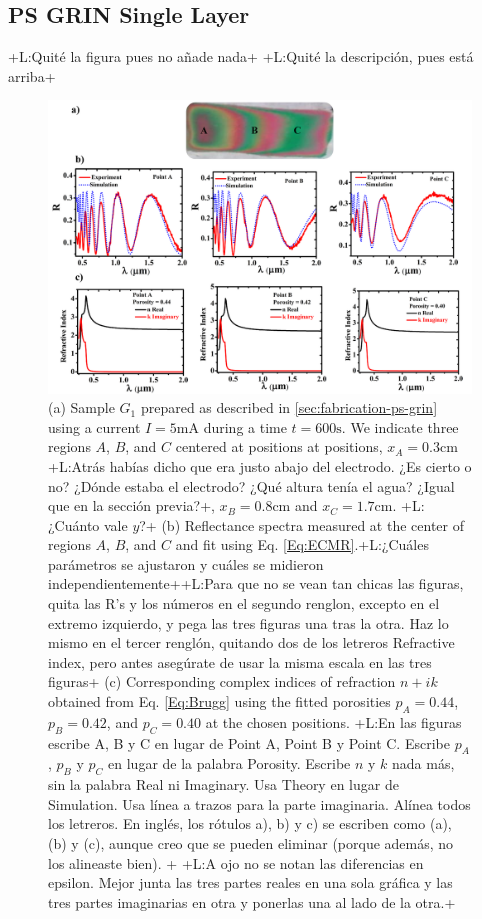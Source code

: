 \documentclass{article}
\newcommand{\notaL}[1]{{\color{blue}+L:#1+}}
\begin{document}
\subsection{PS GRIN Single Layer }
\label{sec:ps-grin-single}
\notaL{Quité la figura pues no añade nada}
\notaL{Quité la descripción, pues está arriba}
\begin{figure}
  \centering
  \includegraphics[width=\textwidth]{Images/SPgrin51}
  \caption{(a)  Sample $G_1$ prepared as described in
     \ref{sec:fabrication-ps-grin} using a current $I=5 \text{mA}$
    during a time $t=600\text{s}$. We indicate three regions $A$,
    $B$, and $C$ centered at positions at positions,
    $x_A=0.3\text{cm}$ \notaL{Atrás habías dicho que era justo abajo
      del electrodo. ¿Es cierto o no? ¿Dónde estaba el electrodo? ¿Qué
    altura tenía el agua? ¿Igual que en la sección previa?}, $x_B=0.8\text{cm}$ and
    $x_C=1.7\text{cm}$. \notaL{¿Cuánto vale $y$?} (b) Reflectance
    spectra measured at the center of regions $A$, $B$, and $C$ and fit
    using Eq. \eqref{Eq:ECMR}.\notaL{¿Cuáles parámetros se ajustaron y
      cuáles se midieron independientemente}\notaL{Para que no se vean
      tan chicas las figuras, quita las R's y los números en el segundo
      renglon, excepto en el extremo izquierdo, y pega las tres
      figuras una tras la otra. Haz lo mismo en el tercer renglón,
      quitando dos de los letreros Refractive index, pero antes
      asegúrate de usar la misma escala en las tres figuras} (c)
    Corresponding complex indices of refraction $n+ik$ obtained from
    Eq. \eqref{Eq:Brugg} using the fitted porosities $p_A=0.44$,
    $p_B=0.42$, and $p_C= 0.40$ at the chosen positions. \notaL{En las
      figuras escribe A, B y C en lugar de
      Point A, Point B y Point C. Escribe $p_A$, $p_B$ y $p_C$ en lugar
      de la palabra Porosity. Escribe $n$ y $k$ nada más, sin la
      palabra Real ni Imaginary. Usa Theory en lugar de
      Simulation. Usa línea a trazos para la parte
      imaginaria. Alínea todos los letreros. En inglés, los rótulos
      a), b) y c) se escriben como (a), (b) y (c), aunque creo que se
      pueden eliminar (porque además, no los alineaste bien). }
  \notaL{A ojo no se notan las diferencias en epsilon. Mejor junta las
  tres partes reales en una sola gráfica y las tres partes imaginarias
en otra y ponerlas una al lado de la otra.}}
  \label{fig:DR3}
\end{figure}
\end{document}
